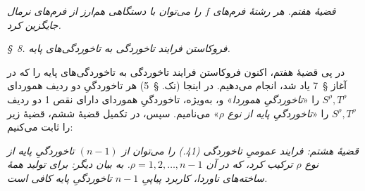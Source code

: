 \documentclass[11pt]{article}
\begin{document}
\emph{قضیهٔ هفتم. هر رشتهٔ فرم‌های $f$ را می‌توان با دستگاهی هم‌ارز از فرم‌های نرمال جایگزین کرد.}

\begin{center}
\emph{\S\ 8. فروکاستن فرایند تاخوردگی به تاخوردگی‌های پایه.}
\end{center}
در پی قضیهٔ هفتم، اکنون فروکاستن فرایند تاخوردگی به تاخوردگی‌های پایه را که در آغاز \S\ 7 یاد شد، انجام می‌دهیم. در اینجا (نک. \S\ 5) هر تاخوردگیِ دو ردیف هموردای $S^\rho,T^\rho$ را «\emph{تاخوردگیِ هموردا}» و، به‌ویژه، تاخوردگیِ هموردای دارای نقص 1 دو ردیف $S^\rho,T^\rho$ را «\emph{تاخوردگیِ پایه از نوع $\rho$}» می‌نامیم. سپس، در تکمیل قضیهٔ ششم، قضیهٔ زیر را ثابت می‌کنیم:

\emph{قضیهٔ هشتم: فرایند عمومیِ تاخوردگی (41.) را می‌توان از $(n-1)$ تاخوردگیِ پایه از نوع $\rho$ ترکیب کرد، که در آن $\rho=1,2,\ldots,n-1$. به بیان دیگر: برای تولید همهٔ ساخته‌های ناوردا، کاربرد پیاپیِ $n-1$ تاخوردگیِ پایه کافی است.}
\end{document}
